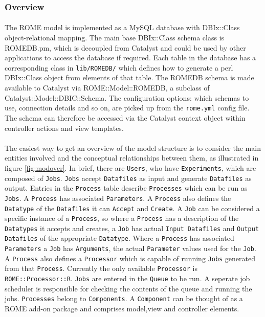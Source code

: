 \subsubsection{Overview}
\label{sec:model_overview}

\paragraph{}
The ROME model is implemented as a MySQL database with DBIx::Class object-relational mapping. The main base DBIx::Class schema class is ROMEDB.pm, which is decoupled from Catalyst and could be used by other applications to access the database if required.  Each table in the database has a corresponding class in \texttt{lib/ROMEDB/} which defines how to generate a perl DBIx::Class object from elements of that table. The ROMEDB schema is made available to Catalyst via ROME::Model::ROMEDB, a subclass of Catalyst::Model::DBIC::Schema. The configuration options: which schemas to use, connection details and so on, are picked up from the \texttt{rome.yml} config file. The schema can therefore be accessed via the Catalyst context object within controller actions and view templates. 

\paragraph{}
The easiest way to get an overview of the model structure is to consider the main entities involved and the conceptual relationships between them, as illustrated in figure \ref{fig:modover}. In brief, there are \texttt{Users}, who have \texttt{Experiments}, which are composed of \texttt{Jobs}. \texttt{Jobs} accept \texttt{Datafiles} as input and generate \texttt{Datafiles} as output. Entries in the \texttt{Process} table describe \texttt{Processes} which can be run as \texttt{Jobs}. A \texttt{Process} has associated \texttt{Parameters}. A \texttt{Process} also defines the \texttt{Datatype} of the \texttt{Datafiles} it can \texttt{Accept} and \texttt{Create}. A \texttt{Job} can be considered a specific instance of a \texttt{Process}, so where a \texttt{Process} has a description of the \texttt{Datatypes} it accepts and creates, a \texttt{Job} has actual \texttt{Input Datafiles} and \texttt{Output Datafiles} of the appropriate \texttt{Datatype}. Where a \texttt{Process} has associated \texttt{Parameters} a \texttt{Job} has \texttt{Arguments}, the actual \texttt{Parameter} values used for the \texttt{Job}. A \texttt{Process} also defines a \texttt{Processor} which is capable of running \texttt{Jobs} generated from that \texttt{Process}. Currently the only available \texttt{Processor} is \texttt{ROME::Processor::R}. \texttt{Jobs} are entered in the \texttt{Queue} to be run. A seperate job scheduler is responsible for checking the contents of the queue and running the jobs. \texttt{Processes} belong to \texttt{Components}. A \texttt{Component} can be thought of as a ROME add-on package and comprises model,view and controller elements. 

